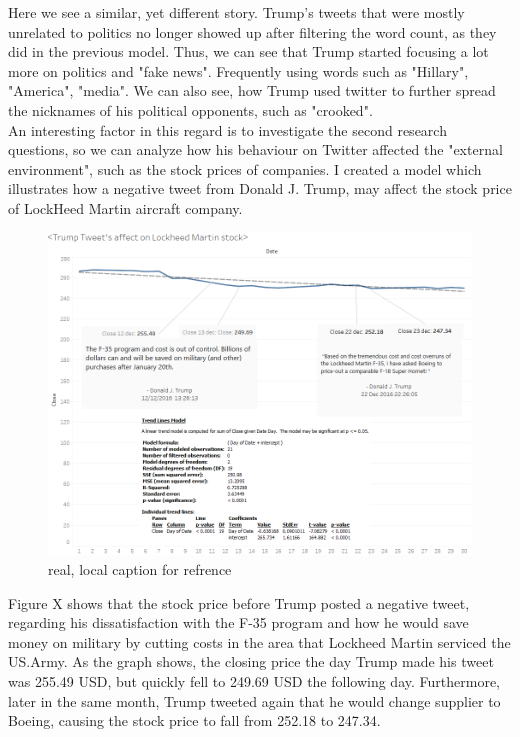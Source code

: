 \documentclass[11pt]{article}
\begin{document}
Here we see a similar, yet different story. Trump's tweets that were mostly unrelated to politics no longer showed up after filtering the word count, as they did in the previous model. Thus, we can see that Trump started focusing a lot more on politics and "fake news". Frequently using words such as "Hillary", "America", "media". We can also see, how Trump used twitter to further spread the nicknames of his political opponents, such as "crooked". \\

An interesting factor in this regard is to investigate the second research questions, so we can analyze how his behaviour on Twitter affected the "external environment", such as the stock prices of companies.  I created a model which illustrates how a negative tweet from Donald J. Trump, may affect the stock price of LockHeed Martin aircraft company.


\begin{figure}[H] %
	\centering %
\includegraphics [scale= .45]  {lockfinal.png}    %
	\caption[Optional caption] {real, local caption for refrence}
	\label{fig:wordcloudBliz}

\end{figure}

Figure X shows that the stock price before Trump posted a negative tweet, regarding his dissatisfaction with the F-35 program and how he would save money on military by cutting costs in the area that Lockheed Martin serviced the US.Army. As the graph shows, the closing price the day Trump made his tweet was 255.49 USD, but quickly fell to 249.69 USD the following day. Furthermore, later in the same month, Trump tweeted again that he would change supplier to Boeing, causing the stock price to fall from 252.18 to 247.34. \\
\end{document}
